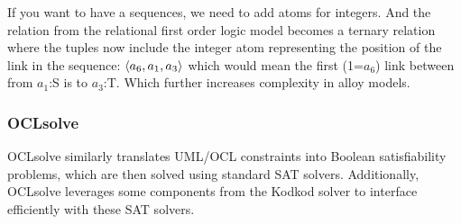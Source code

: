 If you want to have a sequences, we need to add atoms for integers. And the relation  from the relational first order logic model becomes a ternary relation where the tuples now include the integer atom representing the position of the link in the sequence: $\langle a_6,a_1,a_3\rangle$ which would mean the first (1=$a_6$) link between from $a_1$:S is to $a_3$:T.
Which further increases complexity in alloy models.




\subsubsection{OCLsolve}
OCLsolve similarly translates UML/OCL constraints into Boolean satisfiability problems, which are then solved using standard SAT solvers. 
Additionally, OCLsolve leverages some components from the Kodkod solver to interface efficiently with these SAT solvers.
